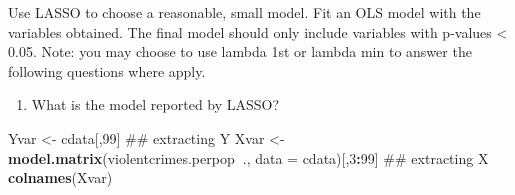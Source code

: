 \documentclass[]{article}
\newenvironment{Shaded}{\begin{snugshade}}{\end{snugshade}}
\newcommand{\KeywordTok}[1]{\textcolor[rgb]{0.13,0.29,0.53}{\textbf{#1}}}
\newcommand{\DataTypeTok}[1]{\textcolor[rgb]{0.13,0.29,0.53}{#1}}
\newcommand{\DecValTok}[1]{\textcolor[rgb]{0.00,0.00,0.81}{#1}}
\newcommand{\StringTok}[1]{\textcolor[rgb]{0.31,0.60,0.02}{#1}}
\newcommand{\OperatorTok}[1]{\textcolor[rgb]{0.81,0.36,0.00}{\textbf{#1}}}
\newcommand{\NormalTok}[1]{#1}
\providecommand{\tightlist}{%
  \setlength{\itemsep}{0pt}\setlength{\parskip}{0pt}}
\begin{document}
Use LASSO to choose a reasonable, small model. Fit an OLS model with the
variables obtained. The final model should only include variables with
p-values \textless{} 0.05. Note: you may choose to use lambda 1st or
lambda min to answer the following questions where apply.

\begin{enumerate}
\def\labelenumi{\arabic{enumi}.}
\tightlist
\item
  What is the model reported by LASSO?
\end{enumerate}

\begin{Shaded}
\begin{Highlighting}[]
\NormalTok{Yvar <-}\StringTok{ }\NormalTok{cdata[,}\DecValTok{99}\NormalTok{] ## extracting Y}
\NormalTok{Xvar <-}\StringTok{ }\KeywordTok{model.matrix}\NormalTok{(violentcrimes.perpop}\OperatorTok{~}\NormalTok{., }\DataTypeTok{data =}\NormalTok{ cdata)[,}\DecValTok{3}\OperatorTok{:}\DecValTok{99}\NormalTok{] ## extracting X }
\KeywordTok{colnames}\NormalTok{(Xvar)}
\end{Highlighting}
\end{Shaded}
\end{document}

